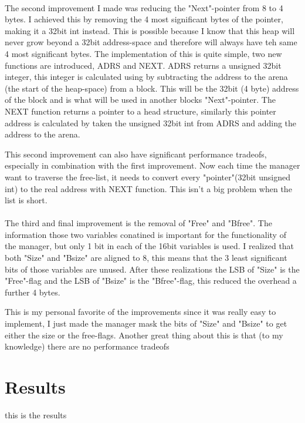 \documentclass[11pt]{article}
\begin{document}
\paragraph{}
The second improvement I made was reducing the "Next"-pointer from 8 to 4 bytes. I achieved this by removing the 4 most significant bytes
of the pointer, making it a 32bit int instead. This is possible because I know that this heap will never grow beyond a 32bit address-space
and therefore will always have teh same 4 most significant bytes. The implementation of this is quite simple, two new functions are 
introduced, ADRS and NEXT. ADRS returns a unsigned 32bit integer, this integer is calculated using by subtracting the address to the arena
(the start of the heap-space) from a block. This will be the 32bit (4 byte) address of the block and is what will be used in another blocks
"Next"-pointer. The NEXT function returns a pointer to a head structure, similarly this pointer address is calculated by taken the 
unsigned 32bit int from ADRS and adding the address to the arena. 

This second improvement can also have significant performance tradeofs, especially in combination with the first improvement. Now each time
the manager want to traverse the free-list, it needs to convert every "pointer"(32bit unsigned int) to the real address with NEXT function.
This isn't a big problem when the list is short.

\paragraph{}
The third and final improvement is the removal of "Free" and "Bfree". The information those two variables conatined is important for the
functionality of the manager, but only 1 bit in each of the 16bit variables is used. I realized that both "Size" and "Bsize" are aligned 
to 8, this means that the 3 least significant bits of those variables are unused. After these realizations the LSB of "Size" is the 
"Free"-flag and the LSB of "Bsize" is the "Bfree"-flag, this reduced the overhead a further 4 bytes.

This is my personal favorite of the improvements since it was really easy to implement, I just made the manager mask the bits of "Size"
and "Bsize" to get either the size or the free-flags. Another great thing about this is that (to my knowledge) there are no performance
tradeofs 

\section{Results}

this is the results
\end{document}
